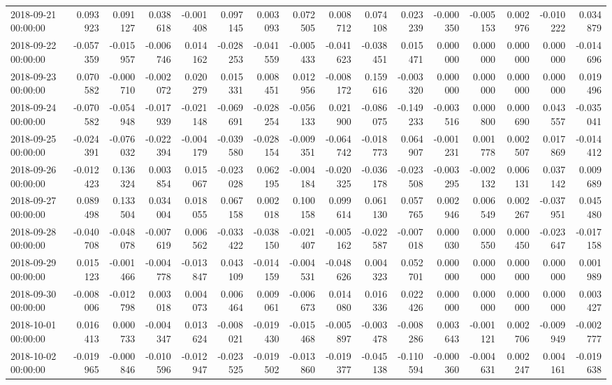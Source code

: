 \begin{tabular}{lrrrrrrrrrrrrrrr}
2018-09-21 00:00:00 & 0.093923 & 0.091127 & 0.038618 & -0.001408 & 0.097145 & 0.003093 & 0.072505 & 0.008712 & 0.074108 & 0.023239 & -0.000350 & -0.005153 & 0.002976 & -0.010222 & 0.034879 \\
2018-09-22 00:00:00 & -0.057359 & -0.015957 & -0.006746 & 0.014162 & -0.028253 & -0.041559 & -0.005433 & -0.041623 & -0.038451 & 0.015471 & 0.000000 & 0.000000 & 0.000000 & 0.000000 & -0.014696 \\
2018-09-23 00:00:00 & 0.070582 & -0.000710 & -0.002072 & 0.020279 & 0.015331 & 0.008451 & 0.012956 & -0.008172 & 0.159616 & -0.003320 & 0.000000 & 0.000000 & 0.000000 & 0.000000 & 0.019496 \\
2018-09-24 00:00:00 & -0.070582 & -0.054948 & -0.017939 & -0.021148 & -0.069691 & -0.028254 & -0.056133 & 0.021900 & -0.086075 & -0.149233 & -0.003516 & 0.000800 & 0.000690 & 0.043557 & -0.035041 \\
2018-09-25 00:00:00 & -0.024391 & -0.076032 & -0.022394 & -0.004179 & -0.039580 & -0.028154 & -0.009351 & -0.064742 & -0.018773 & 0.064907 & -0.001231 & 0.001778 & 0.002507 & 0.017869 & -0.014412 \\
2018-09-26 00:00:00 & -0.012423 & 0.136324 & 0.003854 & 0.015067 & -0.023028 & 0.062195 & -0.004184 & -0.020325 & -0.036178 & -0.023508 & -0.003295 & -0.002132 & 0.006131 & 0.037142 & 0.009689 \\
2018-09-27 00:00:00 & 0.089498 & 0.133504 & 0.034004 & 0.018055 & 0.067158 & 0.002018 & 0.100158 & 0.099614 & 0.061130 & 0.057765 & 0.002946 & 0.006549 & 0.002267 & -0.037951 & 0.045480 \\
2018-09-28 00:00:00 & -0.040708 & -0.048078 & -0.007619 & 0.006562 & -0.033422 & -0.038150 & -0.021407 & -0.005162 & -0.022587 & -0.007018 & 0.000030 & 0.000550 & 0.000450 & -0.023647 & -0.017158 \\
2018-09-29 00:00:00 & 0.015123 & -0.001466 & -0.004778 & -0.013847 & 0.043109 & -0.014159 & -0.004531 & -0.048626 & 0.004323 & 0.052701 & 0.000000 & 0.000000 & 0.000000 & 0.000000 & 0.001989 \\
2018-09-30 00:00:00 & -0.008006 & -0.012798 & 0.003018 & 0.004073 & 0.006464 & 0.009061 & -0.006673 & 0.014080 & 0.016336 & 0.022426 & 0.000000 & 0.000000 & 0.000000 & 0.000000 & 0.003427 \\
2018-10-01 00:00:00 & 0.016413 & 0.000733 & -0.004347 & 0.013624 & -0.008021 & -0.019430 & -0.015468 & -0.005897 & -0.003478 & -0.008286 & 0.003643 & -0.001121 & 0.002706 & -0.009949 & -0.002777 \\
2018-10-02 00:00:00 & -0.019965 & -0.000846 & -0.010596 & -0.012947 & -0.023525 & -0.019502 & -0.013860 & -0.019377 & -0.045138 & -0.110594 & -0.000360 & -0.004631 & 0.002247 & 0.004161 & -0.019638 \\

\end{tabular}
